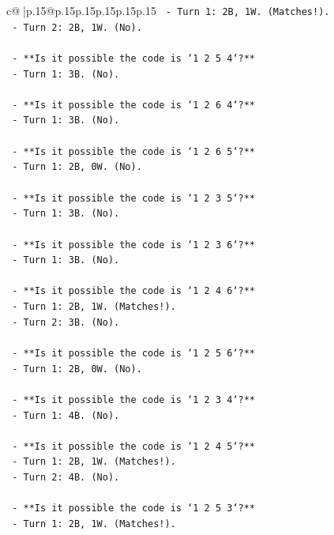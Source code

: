 \documentclass{article}
\begin{document}
{\begin{supertabular}{c@{$\;$}|p{.15\linewidth}@{}p{.15\linewidth}p{.15\linewidth}p{.15\linewidth}p{.15\linewidth}p{.15\linewidth}}
{{{\texttt{        {-} Turn 1: 2B, 1W. (Matches!).} \\
\texttt{        {-} Turn 2: 2B, 1W. (No).} \\
\\ 
\texttt{    {-} **Is it possible the code is `1 2 5 4`?**} \\
\texttt{        {-} Turn 1: 3B. (No).} \\
\\ 
\texttt{    {-} **Is it possible the code is `1 2 6 4`?**} \\
\texttt{        {-} Turn 1: 3B. (No).} \\
\\ 
\texttt{    {-} **Is it possible the code is `1 2 6 5`?**} \\
\texttt{        {-} Turn 1: 2B, 0W. (No).} \\
\\ 
\texttt{    {-} **Is it possible the code is `1 2 3 5`?**} \\
\texttt{        {-} Turn 1: 3B. (No).} \\
\\ 
\texttt{    {-} **Is it possible the code is `1 2 3 6`?**} \\
\texttt{        {-} Turn 1: 3B. (No).} \\
\\ 
\texttt{    {-} **Is it possible the code is `1 2 4 6`?**} \\
\texttt{        {-} Turn 1: 2B, 1W. (Matches!).} \\
\texttt{        {-} Turn 2: 3B. (No).} \\
\\ 
\texttt{    {-} **Is it possible the code is `1 2 5 6`?**} \\
\texttt{        {-} Turn 1: 2B, 0W. (No).} \\
\\ 
\texttt{    {-} **Is it possible the code is `1 2 3 4`?**} \\
\texttt{        {-} Turn 1: 4B. (No).} \\
\\ 
\texttt{    {-} **Is it possible the code is `1 2 4 5`?**} \\
\texttt{        {-} Turn 1: 2B, 1W. (Matches!).} \\
\texttt{        {-} Turn 2: 4B. (No).} \\
\\ 
\texttt{    {-} **Is it possible the code is `1 2 5 3`?**} \\
\texttt{        {-} Turn 1: 2B, 1W. (Matches!).} \\
}}}
\end{supertabular}}
\end{document}

